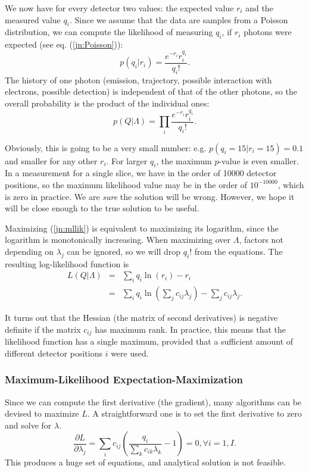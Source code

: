 We now have for every detector two values: the expected value $r_i$ and the
measured value $q_i$. Since we assume that the data are samples from a Poisson
distribution, we can compute the likelihood of measuring $q_i$, if $r_i$
photons were expected (see eq. (\ref{jn:Poisson})):
\begin{equation}
  p(q_i | r_i) = \frac{e^{-r_i} r_i^{q_i}}{q_i!}.
\end{equation}
The history of one photon (emission, trajectory, possible interaction with
electrons, possible detection) is independent of that of the other photons, so
the overall probability is the product of the individual ones:
\begin{equation}
  p(Q | \Lambda) = \prod_i \frac{e^{-r_i} r_i^{q_i}}{q_i!}. \label{jn:mllik}
\end{equation}

Obviously, this is going to be a very small number: e.g. $p(q_i = 15 | r_i =
15) = 0.1$ and smaller for any other $r_i$. For larger $q_i$, the maximum
$p$-value is even smaller. In a measurement for a single slice, we have in the
order of 10000 detector positions, so the maximum likelihood value may be in
the order of $10^{-10000}$, which is zero in practice. We are {\em sure} the
solution will be wrong. However, we hope it will be close enough to the true
solution to be useful.

Maximizing (\ref{jn:mllik}) is equivalent to maximizing its logarithm, since
the logarithm is monotonically increasing. When maximizing over $\Lambda$,
factors not depending on $\lambda_j$ can be ignored, so we will drop $q_i!$
from the equations. The resulting log-likelihood function is
\begin{align}
  L(Q | \Lambda) & = & \sum_i q_i \ln(r_i) - r_i \\
        & = & \sum_i q_i \ln(\sum_j c_{ij} \lambda_j) - \sum_j c_{ij}
           \lambda_j. \label{eq:likelihood}
\end{align}

It turns out that the Hessian (the matrix of second derivatives) is negative
definite if the matrix $c_{ij}$ has maximum rank. In practice, this means that
the likelihood function has a single maximum, provided that a sufficient amount
of different detector positions $i$ were used.

\subsubsection{Maximum-Likelihood Expectation-Maximization}
Since we can compute the first derivative (the gradient), many algorithms can
be devised to maximize $L$. A straightforward one is to set the first
derivative to zero and solve for $\lambda$.
\begin{equation}
 \frac{\partial L}{\partial \lambda_j} = \sum_i c_{ij} \left(
      \frac{q_i}{\sum_k c_{ik} \lambda_k} - 1 \right) = 0, \forall i = 1,I.
       \label{eq:jnmlgrad}
\end{equation}
This produces a huge set of equations, and analytical solution is not
feasible.

